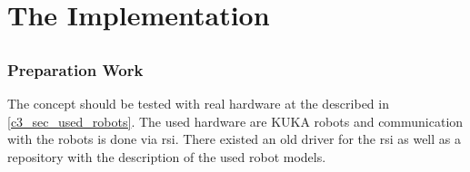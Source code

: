 \part{The Implementation}
\chapter{}
\label{sec:implementation}

\section{Preparation Work}
The concept should be tested with real hardware at the described in \autoref{c3_sec_used_robots}. The used hardware are KUKA robots and communication with the robots is done via \gls{rsi}. There existed an old driver for the \gls{rsi} as well as a repository with the description of the used robot models.
